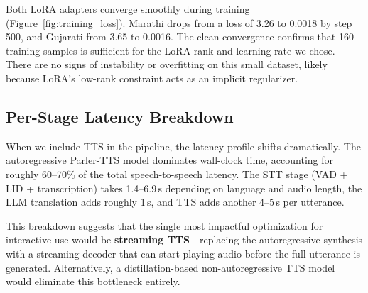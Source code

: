 Both LoRA adapters converge smoothly during training (Figure~\ref{fig:training_loss}). Marathi drops from a loss of 3.26 to 0.0018 by step 500, and Gujarati from 3.65 to 0.0016. The clean convergence confirms that 160 training samples is sufficient for the LoRA rank and learning rate we chose. There are no signs of instability or overfitting on this small dataset, likely because LoRA's low-rank constraint acts as an implicit regularizer.

\subsection{Per-Stage Latency Breakdown}
\label{sec:ablation_latency}

When we include TTS in the pipeline, the latency profile shifts dramatically. The autoregressive Parler-TTS model dominates wall-clock time, accounting for roughly 60--70\% of the total speech-to-speech latency. The STT stage (VAD + LID + transcription) takes 1.4--6.9\,s depending on language and audio length, the LLM translation adds roughly 1\,s, and TTS adds another 4--5\,s per utterance.

This breakdown suggests that the single most impactful optimization for interactive use would be \textbf{streaming TTS}---replacing the autoregressive synthesis with a streaming decoder that can start playing audio before the full utterance is generated. Alternatively, a distillation-based non-autoregressive TTS model would eliminate this bottleneck entirely.
